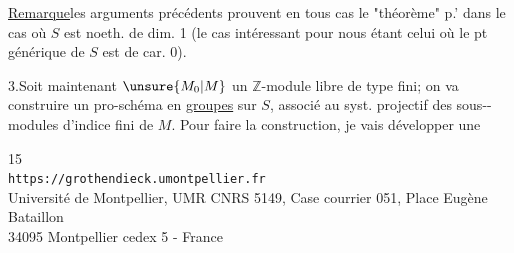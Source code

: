 \uline{Remarque}\quad les arguments précédents prouvent
en tous cas le "théorème"  p.'
dans le cas où $S$ est noeth. de dim. 1
(le cas intéressant pour nous étant celui où le pt générique de $S$
est de car. 0).


3.\quad Soit maintenant $\unsure{M_0|M}$ un $\mathbb Z$-module
libre de type fini; on va construire un
pro-schéma en \uline{groupes} sur $S$, associé
au syst. projectif des sous--modules
d'indice fini de $M$. Pour faire la
construction, je vais développer  une

\begin{center}
\small
15\\
\texttt{https://grothendieck.umontpellier.fr}\\
Université de Montpellier, UMR CNRS 5149, Case courrier 051, Place Eugène Bataillon\\
34095 Montpellier cedex 5 - France
\end{center}



